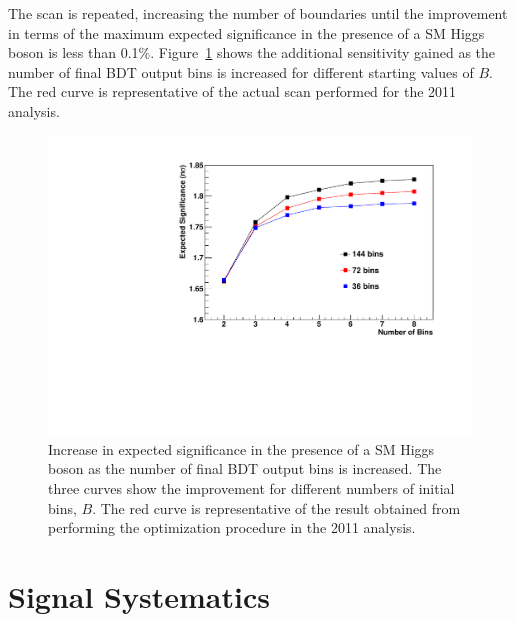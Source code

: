 The scan is repeated, increasing the number of boundaries until the improvement in terms of the 
maximum expected significance in the presence of a SM Higgs boson is less than 0.1\%.
Figure~\ref{fig:binningopt} shows the additional sensitivity gained as the number of final BDT output bins 
is increased for different starting values of $B$. The red curve is representative of the actual scan performed
for the 2011 analysis.

\begin{figure}
\begin{center}
  \includegraphics[width=.8\textwidth]{hgg7TeV/appendix/newbinAlgo.pdf}
\end{center}
 \caption{Increase in expected significance in the presence of a SM Higgs boson as the number of final BDT output bins
 is increased. The three curves show the improvement for different numbers of initial bins, $B$. 
 The red curve is representative of the result obtained from performing the optimization procedure in
 the 2011 analysis.}
 \label{fig:binningopt}
\end{figure}

\section{Signal Systematics}
\label{app:sigsys}

